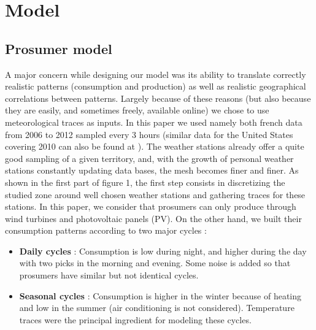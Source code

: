\documentclass[conference]{IEEEtran}
\begin{document}
\section{Model}
\label{sec:model}
\subsection{Prosumer model}

A major concern while designing our model was its ability to translate correctly realistic patterns (consumption and production) as well as realistic geographical correlations between patterns. Largely because of these reasons (but also because they are easily, and sometimes freely, available online) we chose to use meteorological traces as inputs. In this paper we used namely both french data from 2006 to 2012 sampled every 3 hours \cite{Infoclimat} (similar data for the United States covering 2010 can also be found at \cite{NCDC}). The weather stations already offer a quite good sampling of a given territory, and, with the growth of personal weather stations constantly updating data bases, the mesh becomes finer and finer. As shown in the first part of figure 1, the first step consists in discretizing the studied zone around well chosen weather stations and gathering traces for these stations. In this paper, we consider that prosumers can only produce through wind turbines and photovoltaic panels (PV). On the other hand, we built their consumption patterns according to two major cycles :
\begin{itemize}
\item \textbf{Daily cycles} : Consumption is low during night, and higher during the day with two picks in the morning and evening. Some noise is added so that prosumers have similar but not identical cycles.
\item \textbf{Seasonal cycles} : Consumption is higher in the winter because of heating and low in the summer (air conditioning is not considered). Temperature traces were the principal ingredient for modeling these cycles.
\end{itemize} 
\end{document}
